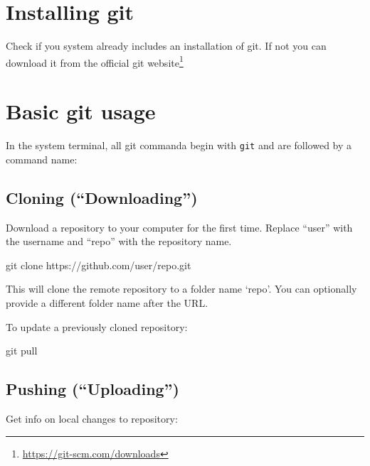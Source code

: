 \documentclass[
]{book}
\newenvironment{Shaded}{\begin{snugshade}}{\end{snugshade}}
\newcommand{\FunctionTok}[1]{\textcolor[rgb]{0.00,0.00,0.00}{#1}}
\newcommand{\NormalTok}[1]{#1}
\DeclareRobustCommand{\href}[2]{#2\footnote{\url{#1}}}
\renewcommand{\href}[2]{#2\footnote{\url{#1}}}
\begin{document}
\hypertarget{installing-git}{%
\section{Installing git}\label{installing-git}}

Check if you system already includes an installation of git. If not you can download it from the official \href{https://git-scm.com/downloads}{git website}

\hypertarget{basic-git-usage}{%
\section{Basic git usage}\label{basic-git-usage}}

In the system terminal, all git commanda begin with \texttt{git} and are followed by a command name:

\hypertarget{cloning-downloading}{%
\subsection{Cloning (``Downloading'')}\label{cloning-downloading}}

Download a repository to your computer for the first time. Replace ``user'' with the username and ``repo'' with the repository name.

\begin{Shaded}
\begin{Highlighting}[]
\FunctionTok{git}\NormalTok{ clone https://github.com/user/repo.git}
\end{Highlighting}
\end{Shaded}

This will clone the remote repository to a folder name `repo'. You can optionally provide a different folder name after the URL.

To update a previously cloned repository:

\begin{Shaded}
\begin{Highlighting}[]
\FunctionTok{git}\NormalTok{ pull}
\end{Highlighting}
\end{Shaded}

\hypertarget{pushing-uploading}{%
\subsection{Pushing (``Uploading'')}\label{pushing-uploading}}

Get info on local changes to repository:
\end{document}
